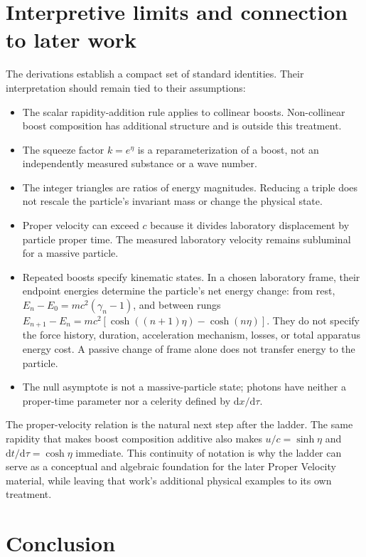 \documentclass[12pt]{article}
\begin{document}
\section{Interpretive limits and connection to later work}
\label{sec:limits}

The derivations establish a compact set of standard identities. Their interpretation should remain tied to their assumptions:
\begin{itemize}[leftmargin=*]
  \item The scalar rapidity-addition rule applies to collinear boosts. Non-collinear boost composition has additional structure and is outside this treatment.
  \item The squeeze factor $k=e^\eta$ is a reparameterization of a boost, not an independently measured substance or a wave number.
  \item The integer triangles are ratios of energy magnitudes. Reducing a triple does not rescale the particle's invariant mass or change the physical state.
  \item Proper velocity can exceed $c$ because it divides laboratory displacement by particle proper time. The measured laboratory velocity remains subluminal for a massive particle.
  \item Repeated boosts specify kinematic states. In a chosen laboratory frame, their endpoint energies determine the particle's net energy change: from rest, $E_n-E_0=mc^2(\gamma_n-1)$, and between rungs $E_{n+1}-E_n=mc^2[\cosh((n+1)\eta)-\cosh(n\eta)]$. They do not specify the force history, duration, acceleration mechanism, losses, or total apparatus energy cost. A passive change of frame alone does not transfer energy to the particle.
  \item The null asymptote is not a massive-particle state; photons have neither a proper-time parameter nor a celerity defined by $\mathrm{d}x/\mathrm{d}\tau$.
\end{itemize}

The proper-velocity relation is the natural next step after the ladder. The same rapidity that makes boost composition additive also makes $u/c=\sinh\eta$ and $\mathrm{d}t/\mathrm{d}\tau=\cosh\eta$ immediate. This continuity of notation is why the ladder can serve as a conceptual and algebraic foundation for the later Proper Velocity material, while leaving that work's additional physical examples to its own treatment.

\section{Conclusion}
\end{document}

